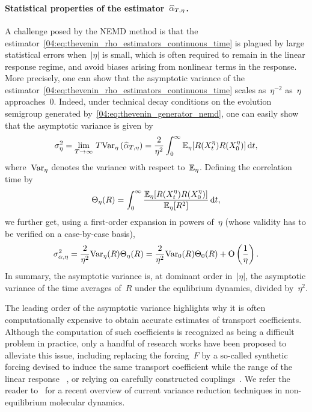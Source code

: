 \paragraph{Statistical properties of the estimator~$\widehat{\alpha}_{T,\eta}$.}
A challenge posed by the NEMD method is that the estimator~\eqref{04:eq:thevenin_rho_estimators_continuous_time} is plagued by large statistical errors when~$|\eta|$ is small, which is often required to remain in the linear response regime, and avoid biases arising from nonlinear terms in the response. More precisely, one can show that the asymptotic variance of the estimator~\eqref{04:eq:thevenin_rho_estimators_continuous_time} scales as~$\eta^{-2}$ as~$\eta$ approaches~$0$. Indeed, under technical decay conditions on the evolution semigroup generated by~\eqref{04:eq:thevenin_generator_nemd}, one can easily show that the asymptotic variance is given by
\begin{equation}
\label{04:eq:av_thevenin}
\sigma_{\eta}^2 = \lim_{T\to\infty}\, T\mathrm{Var}_\eta\left(\widehat{\alpha}_{T,\eta}\right) =  \frac{2}{\eta^2}\int_0^\infty \mathbb{E}_{\eta}[R(X_{t}^\eta)R(X_0^\eta)]\,\mathrm{d} t,
\end{equation}
where~$\mathrm{Var}_\eta$ denotes the variance with respect to~$\mathbb{E}_\eta$.
Defining the correlation time by
\begin{equation}
\label{04:eq:nemd_correlation_time}
    \Theta_{\eta}(R) = \int_{0}^\infty \frac{\mathbb{E}_\eta[R(X_t^\eta)R(X_0^\eta)]}{\mathbb{E}_\eta[R^2]}\,\mathrm{d} t,
\end{equation}
we further get, using a first-order expansion in powers of~$\eta$ (whose validity has to be verified on a case-by-case basis), 
\begin{equation}
    \label{04:eq:nemd_av_asymptotic}
    \sigma_{\alpha,\eta}^2=\frac{2}{\eta^2}\mathrm{Var}_\eta(R)\Theta_{\eta}(R)=\frac2{\eta^2}\mathrm{Var}_0(R)\Theta_0(R) +\mathrm{O}\left(\frac1\eta\right).
\end{equation}
In summary, the asymptotic variance is, at dominant order in~$|\eta|$, the asymptotic variance of the time averages of~$R$ under the equlibrium dynamics, divided by~$\eta^2$.

The leading order of the asymptotic variance highlights why it is often computationally expensive to obtain accurate estimates of transport coefficients. Although the computation of such coefficients is recognized as being a difficult problem in practice, only a handful of research works have been proposed to alleviate this issue, including replacing the forcing~$F$ by a so-called synthetic forcing devised to induce the same transport coefficient while the range of the linear response ~\cite{SS23}, or relying on carefully constructed couplings~\cite{DES24}. We refer the reader to~\cite[Section~4]{S22} for a recent overview of current variance reduction techniques in non-equilibrium molecular dynamics.

